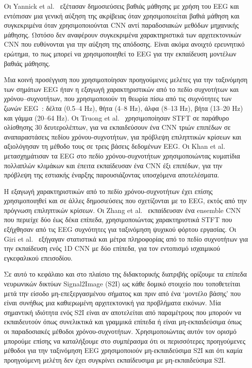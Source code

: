 Οι Yannick et al.~\cite{yannick2019deep} εξέτασαν δημοσιεύσεις βαθιάς μάθησης με χρήση του EEG και εντόπισαν μια γενική αύξηση της ακρίβειας όταν χρησιμοποιείται βαθιά μάθηση και συγκεκριμένα όταν χρησιμοποιούνται CNN αντί παραδοσιακών μεθόδων μηχανικής μάθησης.
Ωστόσο δεν αναφέρουν συγκεκριμένα χαρακτηριστικά των αρχιτεκτονικών CNN που ευθύνονται για την αύξηση της απόδοσης.
Είναι ακόμα ανοιχτό ερευνητικό ερώτημα, το πως μπορεί να χρησιμοποιηθεί το EEG για την εκπαίδευση μοντέλων βαθιάς μάθησης.

Μια κοινή προσέγγιση που χρησιμοποίησαν προηγούμενες μελέτες για την ταξινόμηση των σημάτων EEG ήταν η εξαγωγή χαρακτηριστικών από το πεδίο συχνοτήτων και χρόνου--συχνοτήτων, που χρησιμοποιούν τη θεωρία πίσω από τις συχνότητες των ζωνών EEG~\cite{langkvist2012sleep}: δέλτα (0.5--4 Hz), θήτα (4--8 Hz), άλφα (8--13 Hz), βήτα (13--20 Hz) και γάμμα (20--64 Hz).
Οι Truong et al.~\cite{truong2018convolutional} χρησιμοποίησαν STFT σε παράθυρο ολίσθησης 30 δευτερολέπτων, για να εκπαιδεύσουν ένα CNN τριών επιπέδων σε αναπαραστάσεις πεδίου χρόνου-συχνοτήτων, για πρόβλεψη επιληπτικών κρίσεων και αξιολόγησαν τη μέθοδο τους σε τρεις βάσεις δεδομένων EEG\@.
Οι Khan et al.~\cite{khan2018focal} μετασχημάτισαν τα EEG στο πεδίο χρόνου-συχνοτήτων χρησιμοποιώντας κυματίδια πολλαπλών κλιμάκων και έπειτα εκπαίδευσαν ένα CNN έξι επιπέδων, για την πρόβλεψη της εστιακής έναρξης παρουσιάζοντας υποσχόμενα αποτελέσματα.

Η εξαγωγή χαρακτηριστικών από το πεδίο χρόνου-συχνοτήτων έχει επίσης χρησιμοποιηθεί και σε άλλες δημοσιεύσεις που σχετίζονται με το EEG, εκτός από την πρόγνωση επιληπτικών κρίσεων.
Οι Zhang et al.~\cite{zhang2017pattern} εκπαίδευσαν ένα ensemble CNN που περιείχε δύο έως δέκα επίπεδα, χρησιμοποιώντας χαρακτηριστικά STFT που εξήχθησαν από τις EEG συχνότητες για ταξινόμηση ψυχικού φόρτου εργασίας.
Οι Giri et al.~\cite{giri2016ischemic} εξήγαγαν στατιστικά και μέτρα πληροφορίας από το πεδίο συχνοτήτων για την εκπαίδευση ενός 1D CNN με δύο επίπεδα, για τον εντοπισμό ισχαιμικού εγκεφαλικού επεισοδίου.

Σε αυτό το κεφάλαιο και στο πλαίσιο της διδακτορικής διατριβής ορίζουμε τα επίπεδα νευρωνικών δικτύων Signal2Image (S2I) ως κάθε δομικό στοιχείο που τοποθετείται μετά την είσοδο μη-επεξεργασμένου σήματος και πριν από ένα `μοντέλο βάσης' που είναι συνήθως μια καθιερωμένη αρχιτεκτονική για προβλήματα εικόνων.
Μία σημαντική ιδιότητα ενός S2I είναι αν αποτελείται από παραμέτρους που μπορούν να εκπαιδευτούν όπως συνελικτικά και γραμμικά επίπεδα ή είναι μη-εκπαιδεύσιμα όπως οι παραδοσιακές μέθοδοι χρόνου-συχνοτήτων.
Χρησιμοποιώντας αυτόν τον ορισμό μπορούμε επίσης να καταλήξουμε στο συμπέρασμα ότι οι περισσότερες προηγούμενες μέθοδοι για την ταξινόμηση EEG χρησιμοποιούν μη-εκπαιδεύσιμα S2I και ότι καμία προηγούμενη μελέτη δεν έχει συγκρίνει εκπαίδευσιμα με μη-εκπαιδεύσιμα S2I.

